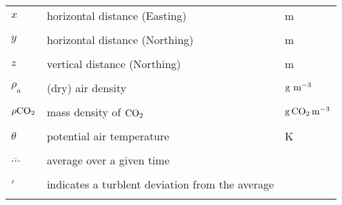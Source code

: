 \begin{longtable}{L{3cm}L{6cm}L{3cm}}
$x$			&	horizontal distance (Easting)	&  m\\\\

$y$			&	horizontal distance (Northing)	&  m\\\\

$z$			&	vertical distance (Northing)	&  m\\\\

$\rho_{a}$ 	& 	(dry) air density		&  $\rm{g\ m^{-3}}$ \\\\

$\rho\rm{CO}_2$ & mass density of $\rm{CO}_2$ &  $\rm{g}\,\rm{CO}_{2}\, \rm{m}^{-3}$\\\\

$\theta$ & potential air temperature & K \\\\

$\overline{...}$ 	&	average over a given time		&   \\\\

$\prime$	&	indicates a turblent deviation from the average	& \\\\


\bottomrule 
\end{longtable}













